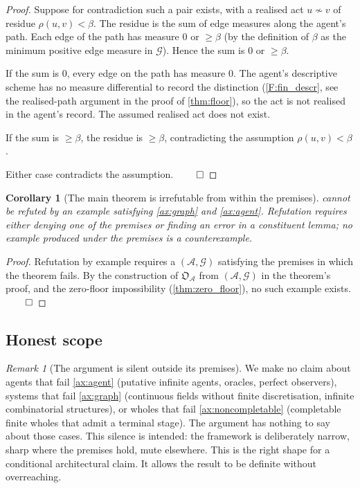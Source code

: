 \documentclass[11pt,twocolumn,a4paper]{article}
\theoremstyle{thmstyle}
\newtheorem{corollary}[theorem]{Corollary}
\theoremstyle{definition}
\theoremstyle{remark}
\newtheorem{remark}[theorem]{Remark}
\newcommand{\Graph}{\mathcal{G}}
\newcommand{\Agent}{\mathcal{A}}
\newcommand{\Res}{\rho}
\newcommand{\floor}{\beta}
\newcommand{\OpStr}{\mathfrak{O}}
\begin{document}
\begin{proof}
Suppose for contradiction such a pair exists, with a realised act
$u \not\sim v$ of residue $\Res(u, v) < \floor$. The residue is the
sum of edge measures along the agent's path. Each edge of the path
has measure $0$ or $\geq \floor$ (by the definition of $\floor$ as
the minimum positive edge measure in $\Graph$). Hence the sum is
$0$ or $\geq \floor$.

If the sum is $0$, every edge on the path has measure $0$. The
agent's descriptive scheme has no measure differential to record
the distinction (\cref{F:fin_descr}, see the realised-path argument
in the proof of \cref{thm:floor}), so the act is not realised in
the agent's record. The assumed realised act does not exist.

If the sum is $\geq \floor$, the residue is $\geq \floor$,
contradicting the assumption $\Res(u, v) < \floor$.

Either case contradicts the assumption. $\qed$
\end{proof}

\begin{corollary}[The main theorem is irrefutable from within the
premises]
\label{cor:irrefutable}
 cannot be refuted by an example satisfying
\cref{ax:graph} and \cref{ax:agent}. Refutation requires either
denying one of the premises or finding an error in a constituent
lemma; no example produced under the premises is a counterexample.
\end{corollary}

\begin{proof}
Refutation by example requires a $(\Agent, \Graph)$ satisfying the
premises in which the theorem fails. By the construction of
$\OpStr_\Agent$ from $(\Agent, \Graph)$ in the theorem's proof, and
the zero-floor impossibility (\cref{thm:zero_floor}), no such
example exists. $\qed$
\end{proof}

\subsection{Honest scope}

\begin{remark}[The argument is silent outside its premises]
\label{rem:silent}
We make no claim about agents that fail \cref{ax:agent} (putative
infinite agents, oracles, perfect observers), systems that fail
\cref{ax:graph} (continuous fields without finite discretisation,
infinite combinatorial structures), or wholes that fail
\cref{ax:noncompletable} (completable finite wholes that admit a
terminal stage). The argument has nothing to say about those cases.
This silence is intended: the framework is deliberately narrow,
sharp where the premises hold, mute elsewhere. This is the right
shape for a conditional architectural claim. It allows the result
to be definite without overreaching.
\end{remark}
\end{document}
